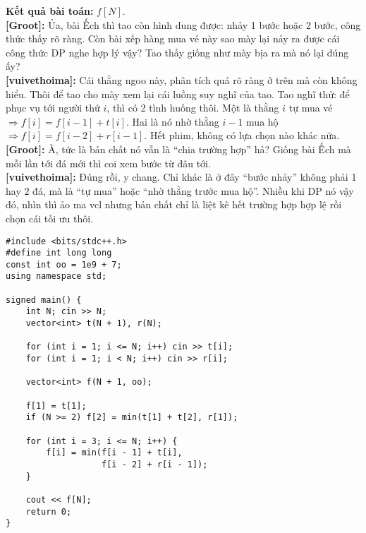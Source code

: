 \textbf{Kết quả bài toán:} $f[N]$.\\

\textbf{[Groot]:} Ủa, bài Ếch thì tao còn hình dung được: nhảy 1 bước hoặc 2 bước, công thức thấy rõ ràng.  
Còn bài xếp hàng mua vé này sao mày lại nảy ra được cái công thức DP nghe hợp lý vậy? Tao thấy giống như mày bịa ra mà nó lại đúng ấy? \\

\textbf{[vuivethoima]:} Cái thằng ngoo này, phân tích quá rõ ràng ở trên mà còn không hiểu. Thôi để tao cho mày xem lại cái luồng suy nghĩ của tao. Tao nghĩ thử: để phục vụ tới người thứ $i$, thì có 2 tình huống thôi.  
Một là thằng $i$ tự mua vé $\Rightarrow f[i] = f[i-1] + t[i]$.  
Hai là nó nhờ thằng $i-1$ mua hộ $\Rightarrow f[i] = f[i-2] + r[i-1]$.  
Hết phim, không có lựa chọn nào khác nữa.\\

\textbf{[Groot]:} À, tức là bản chất nó vẫn là ``chia trường hợp'' hả? Giống bài Ếch mà mỗi lần tới đá mới thì coi xem bước từ đâu tới.\\

\textbf{[vuivethoima]:} Đúng rồi, y chang. Chỉ khác là ở đây ``bước nhảy'' không phải 1 hay 2 đá, mà là ``tự mua'' hoặc ``nhờ thằng trước mua hộ''. Nhiều khi DP nó vậy đó, nhìn thì ảo ma vcl nhưng bản chất chỉ là liệt kê hết trường hợp hợp lệ rồi chọn cái tối ưu thôi.

\begin{lstlisting}[title=\centering \textbf{Cài đặt}]
#include <bits/stdc++.h>
#define int long long
const int oo = 1e9 + 7;
using namespace std;

signed main() {
    int N; cin >> N;
    vector<int> t(N + 1), r(N);

    for (int i = 1; i <= N; i++) cin >> t[i];
    for (int i = 1; i < N; i++) cin >> r[i];

    vector<int> f(N + 1, oo);

    f[1] = t[1];
    if (N >= 2) f[2] = min(t[1] + t[2], r[1]);

    for (int i = 3; i <= N; i++) {
        f[i] = min(f[i - 1] + t[i],
                   f[i - 2] + r[i - 1]);
    }

    cout << f[N];
    return 0;
}
\end{lstlisting}


